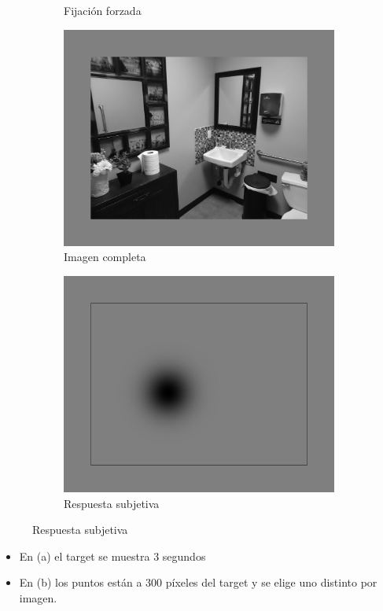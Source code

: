 \documentclass[compress]{beamer}
\begin{document}
\begin{frame}
\begin{figure}[!b]
\begin{subfigure}[b]{0.24\textwidth}
        \caption{\tiny Fijación forzada}
    \end{subfigure}
    \hfill
    \begin{subfigure}[b]{0.24\textwidth}
        \centering
        \includegraphics[width=\linewidth]{images/full_bathroom.jpg} 
        \caption{\tiny Imagen completa}
    \end{subfigure}
    \hfill
    \begin{subfigure}[b]{0.24\textwidth}
        \centering
        \includegraphics[width=\linewidth]{images/subjective_response_ahora.jpg} 
        \caption{\tiny Respuesta subjetiva}
    \end{subfigure}
\end{figure}

\begin{itemize}
\item En (a) el target se muestra 3 segundos
\item En (b) los puntos están a 300 píxeles del target y se elige uno distinto por imagen.
\end{itemize}

\end{frame}
\end{document}
